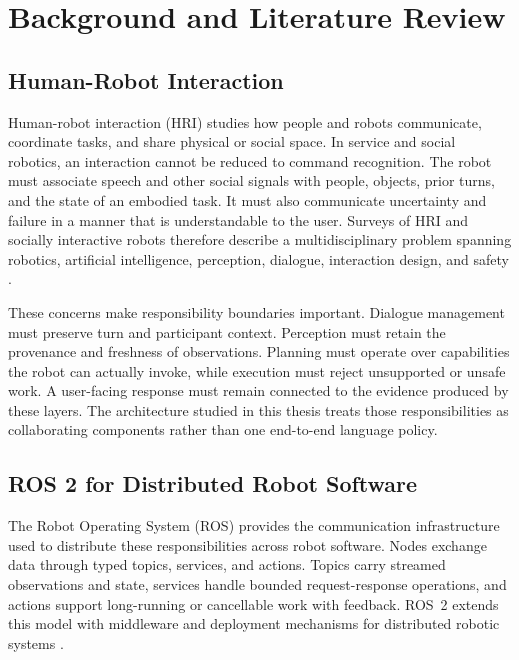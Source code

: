 \chapter{Background and Literature Review}
\label{chap:background}

\section{Human-Robot Interaction}

Human-robot interaction (HRI) studies how people and robots communicate, coordinate tasks, and share physical or social space. In service and social robotics, an interaction cannot be reduced to command recognition. The robot must associate speech and other social signals with people, objects, prior turns, and the state of an embodied task. It must also communicate uncertainty and failure in a manner that is understandable to the user. Surveys of HRI and socially interactive robots therefore describe a multidisciplinary problem spanning robotics, artificial intelligence, perception, dialogue, interaction design, and safety \parencite{fong2003survey,goodrich2007human}.

These concerns make responsibility boundaries important. Dialogue management must preserve turn and participant context. Perception must retain the provenance and freshness of observations. Planning must operate over capabilities the robot can actually invoke, while execution must reject unsupported or unsafe work. A user-facing response must remain connected to the evidence produced by these layers. The architecture studied in this thesis treats those responsibilities as collaborating components rather than one end-to-end language policy.

\section{ROS 2 for Distributed Robot Software}

The Robot Operating System (ROS) provides the communication infrastructure used to distribute these responsibilities across robot software. Nodes exchange data through typed topics, services, and actions. Topics carry streamed observations and state, services handle bounded request-response operations, and actions support long-running or cancellable work with feedback. ROS~2 extends this model with middleware and deployment mechanisms for distributed robotic systems \parencite{quigley2009ros,macenski2022ros2}.

